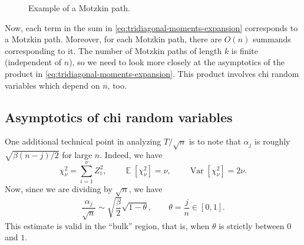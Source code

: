 \documentclass[letterpaper,11pt,oneside,reqno]{article}
\numberwithin{equation}{section}
\theoremstyle{definition}
\begin{document}
\begin{figure}[htb]
 \begin{center}
	\caption{Example of a Motzkin path.}
  \label{fig:motzkin}
 \end{center}
\end{figure}

Now, each term in the sum in \eqref{eq:tridiagonal-moments-expansion}
corresponds to a Motzkin path. Moreover, for each Motzkin path,
there are $O(n)$ summands corresponding to it. The number of
Motzkin paths of length $k$ is finite (independent of $n$),
so we need to look more closely at the asymptotics of the product
in \eqref{eq:tridiagonal-moments-expansion}. This product
involves chi random variables which depend on $n$, too.

\subsection{Asymptotics of chi random variables}
\label{sub:chi-asymptotics}

One additional technical point in analyzing $T/\sqrt{n}$ is to note that $\alpha_j$
is roughly $\sqrt{\beta(n-j)/2}$ for large $n$.
Indeed, we have
\begin{equation*}
	\chi^2_\nu=\sum_{i=1}^\nu Z_i^2,\qquad
	\operatorname{\mathbb{E}}[\chi^2_\nu]=\nu,\qquad
	\operatorname{Var}[\chi^2_\nu]=2\nu.
\end{equation*}
Now, since we are dividing by $\sqrt n$, we have
\begin{equation*}
	\frac{\alpha_j}{\sqrt n}\sim \sqrt{\frac{\beta}{2}}\sqrt{1-\theta},\qquad
	\theta=\frac{j}{n}\in [0,1].
\end{equation*}
This estimate is valid in the ``bulk'' region, that is, when $\theta$ is strictly between $0$ and $1$.
\end{document}
